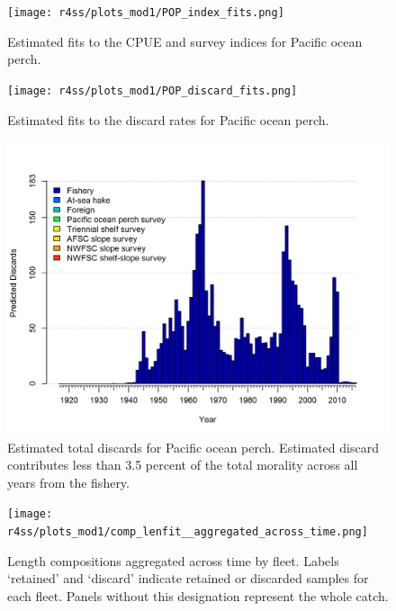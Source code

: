 \documentclass[12pt,]{article}
\begin{document}
\FloatBarrier

\begin{figure}
\centering
\texttt{[image: r4ss/plots\_mod1/POP\_index\_fits.png]}
\caption{Estimated fits to the CPUE and survey indices for Pacific ocean
perch. \label{fig:index_fits}}
\end{figure}

\FloatBarrier 

\begin{figure}
\centering
\texttt{[image: r4ss/plots\_mod1/POP\_discard\_fits.png]}
\caption{Estimated fits to the discard rates for Pacific ocean perch.
\label{fig:discard_fits}}
\end{figure}

\FloatBarrier 

\begin{figure}
\centering
\includegraphics{r4ss/plots_mod1/catch7 discards stacked plot (depends on multiple fleets).png}
\caption{Estimated total discards for Pacific ocean perch. Estimated
discard contributes less than 3.5 percent of the total morality across
all years from the fishery. \label{fig:total_discard}}
\end{figure}

\begin{figure}
\centering
\texttt{[image: r4ss/plots\_mod1/comp\_lenfit\_\_aggregated\_across\_time.png]}
\caption{Length compositions aggregated across time by fleet. Labels
`retained' and `discard' indicate retained or discarded samples for each
fleet. Panels without this designation represent the whole catch.
\label{fig:length_agg}}
\end{figure}
\end{document}
